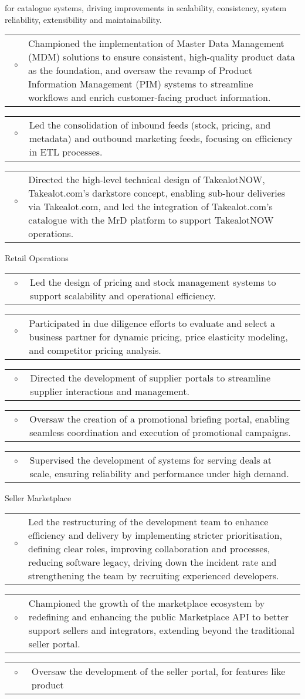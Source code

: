 \documentclass[10pt,a4paper,final]{columncv}
\makeatletter
\newcommand{\cvitembullet}[1]{%
  \begin{tabularx}{\linewidth}{@{}l@{\hspace{0.1em}}X@{}}
    ~$\circ$~ & #1 \\
  \end{tabularx}%
}
\makeatother
\begin{document}
\begin{cvenv}
{{             for catalogue systems, driving improvements in scalability, consistency,
             system reliability, extensibility and maintainability.}
            \cvitembullet{Championed the implementation of Master Data Management (MDM)
             solutions to ensure consistent, high-quality product data as the foundation,
             and oversaw the revamp of Product Information Management (PIM) systems to streamline
             workflows and enrich customer-facing product information.}
            \cvitembullet{Led the consolidation of inbound feeds (stock, pricing, and
             metadata) and outbound marketing feeds, focusing on efficiency
             in ETL processes.}
            \cvitembullet{Directed the high-level technical design of TakealotNOW, Takealot.com's
             darkstore concept, enabling sub-hour deliveries via Takealot.com, and led the
             integration of Takealot.com's catalogue with the MrD platform to support TakealotNOW
             operations.}
         }
         {Retail Operations
            \cvitembullet{Led the design of pricing and stock management systems to support
             scalability and operational efficiency.}
            \cvitembullet{Participated in due diligence efforts to evaluate and select a business
             partner for dynamic pricing, price elasticity modeling, and competitor pricing analysis.}
            \cvitembullet{Directed the development of supplier portals to streamline supplier
             interactions and management.}
            \cvitembullet{Oversaw the creation of a promotional briefing portal, enabling
             seamless coordination and execution of promotional campaigns.}
            \cvitembullet{Supervised the development of systems for serving deals at scale,
             ensuring reliability and performance under high demand.}
          Seller Marketplace
             \cvitembullet{Led the restructuring of the development team to enhance efficiency and
              delivery by implementing stricter prioritisation, defining clear roles, improving
              collaboration and processes, reducing software legacy, driving down the incident rate
              and strengthening the team by recruiting experienced developers.}
             \cvitembullet{Championed the growth of the marketplace ecosystem by redefining and
              enhancing the public Marketplace API to better support sellers and integrators,
              extending beyond the traditional seller portal.}
             \cvitembullet{Oversaw the development of the seller portal, for features like product
}}
\end{cvenv}
\end{document}
